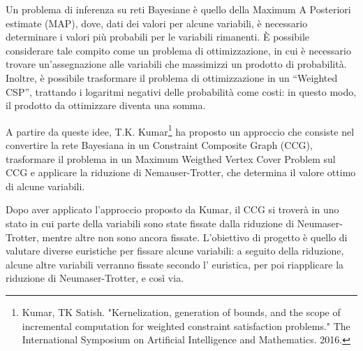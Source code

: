 Un problema di inferenza su reti Bayesiane è quello della Maximum A Posteriori estimate (MAP), dove, dati dei valori per alcune variabili, è necessario determinare i valori più probabili per le variabili rimanenti. È possibile considerare tale compito come un problema di ottimizzazione, in cui è necessario trovare un'assegnazione alle variabili che massimizzi un prodotto di probabilità. Inoltre, è possibile trasformare il problema di ottimizzazione in un ``Weighted CSP'', trattando i logaritmi negativi delle probabilità come costi: in questo modo, il prodotto da ottimizzare diventa una somma.

A partire da queste idee, T.K. Kumar\footnote{Kumar, TK Satish. "Kernelization, generation of bounds, and the scope of incremental computation for weighted constraint satisfaction problems." The International Symposium on Artificial Intelligence and Mathematics. 2016.} ha proposto un approccio che consiste nel convertire la rete Bayesiana in un Constraint Composite Graph (CCG), trasformare il problema in un Maximum Weigthed Vertex Cover Problem sul CCG e applicare la riduzione di Nemauser-Trotter, che determina il valore ottimo di alcune variabili.

Dopo aver applicato l'approccio proposto da Kumar, il CCG si troverà in uno stato in cui parte della variabili sono state fissate dalla riduzione di Neumaser-Trotter, mentre altre non sono ancora fissate. L'obiettivo di progetto è quello di valutare diverse euristiche per fissare alcune variabili: a seguito della riduzione, alcune altre variabili verranno fissate secondo l' euristica, per poi riapplicare la riduzione di Neumaser-Trotter, e così via. 
